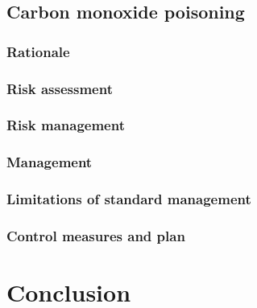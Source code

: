 \documentclass[12pt,a4paper]{article}
\begin{document}
\subsection{Carbon monoxide poisoning}

\subsubsection{Rationale}

\subsubsection{Risk assessment}

\subsubsection{Risk management}

\subsubsection{Management}

\subsubsection{Limitations of standard management}

\subsubsection{Control measures and plan}

\section{Conclusion}





\end{document}
